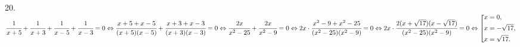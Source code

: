 20. $\cfrac{1}{x+5}+\cfrac{1}{x+3}+\cfrac{1}{x-5}+\cfrac{1}{x-3}=0\Leftrightarrow \cfrac{x+5+x-5}{(x+5)(x-5)}+\cfrac{x+3+x-3}{(x+3)(x-3)}=0\Leftrightarrow
\cfrac{2x}{x^2-25}+\cfrac{2x}{x^2-9}=0\Leftrightarrow 2x\cdot \cfrac{x^2-9+x^2-25}{(x^2-25)(x^2-9)}=0\Leftrightarrow 2x\cdot \cfrac{2(x+\sqrt{17})(x-\sqrt{17})}{(x^2-25)(x^2-9)}=0 \Leftrightarrow
    \left[
      \begin{gathered}
        x=0, \hfill
        \\
        x=-\sqrt{17}, \hfill
        \\
        x=\sqrt{17}. \hfill
      \end{gathered}
    \right. \hfill$\\
